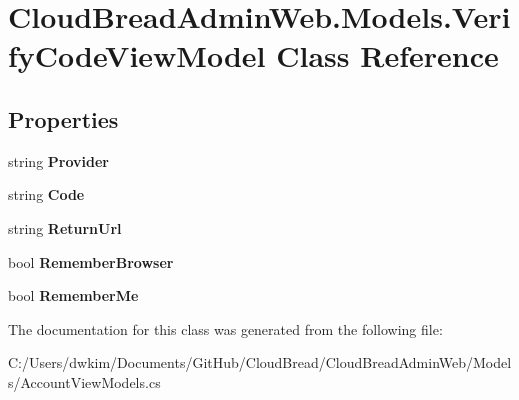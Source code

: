 \hypertarget{a00192}{}\section{Cloud\+Bread\+Admin\+Web.\+Models.\+Verify\+Code\+View\+Model Class Reference}
\label{a00192}
\subsection*{Properties}
\begin{DoxyCompactItemize}
\item 
string {\bfseries Provider}\hypertarget{a00192_a482c4ecbfdeee70f5bbe4cba40761124}{}\label{a00192_a482c4ecbfdeee70f5bbe4cba40761124}

\item 
string {\bfseries Code}\hypertarget{a00192_a94b556595a385a7c8b157631b6fe725f}{}\label{a00192_a94b556595a385a7c8b157631b6fe725f}

\item 
string {\bfseries Return\+Url}\hypertarget{a00192_a6d21943b62168f105ae0a6831410e5d8}{}\label{a00192_a6d21943b62168f105ae0a6831410e5d8}

\item 
bool {\bfseries Remember\+Browser}\hypertarget{a00192_a5a1831eb77112abc072cc06b6bcee35a}{}\label{a00192_a5a1831eb77112abc072cc06b6bcee35a}

\item 
bool {\bfseries Remember\+Me}\hypertarget{a00192_a336d6fbeedd08dd5f3d31eeca854c1ce}{}\label{a00192_a336d6fbeedd08dd5f3d31eeca854c1ce}

\end{DoxyCompactItemize}


The documentation for this class was generated from the following file\+:\begin{DoxyCompactItemize}
\item 
C\+:/\+Users/dwkim/\+Documents/\+Git\+Hub/\+Cloud\+Bread/\+Cloud\+Bread\+Admin\+Web/\+Models/Account\+View\+Models.\+cs\end{DoxyCompactItemize}
